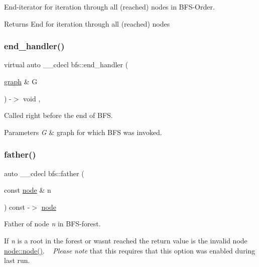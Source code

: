End-\/iterator for iteration through all (reached) nodes in B\+F\+S-\/\+Order. 

\begin{DoxyReturn}{Returns}
End for iteration through all (reached) nodes 
\end{DoxyReturn}
\mbox{\label{classbfs_a6c31ed93b4646218a90ded9ef7bb8366}} 
\subsubsection{\texorpdfstring{end\+\_\+handler()}{end\_handler()}}
{\footnotesize\ttfamily virtual auto \+\_\+\+\_\+cdecl bfs\+::end\+\_\+handler (\begin{DoxyParamCaption}\item[{\mbox{\hyperlink{classgraph}{graph}} \&}]{G }\end{DoxyParamCaption}) -\/$>$ void \hspace{0.3cm}{\ttfamily [inline]}, {\ttfamily [virtual]}}



Called right before the end of B\+FS. 


\begin{DoxyParams}{Parameters}
{\em G} & graph for which B\+FS was invoked. \\
\hline
\end{DoxyParams}
\mbox{\label{classbfs_ab8a8b65048c4ffb6caa7651b793e4e56}} 
\subsubsection{\texorpdfstring{father()}{father()}}
{\footnotesize\ttfamily auto \+\_\+\+\_\+cdecl bfs\+::father (\begin{DoxyParamCaption}\item[{const \mbox{\hyperlink{classnode}{node}} \&}]{n }\end{DoxyParamCaption}) const -\/$>$ \mbox{\hyperlink{classnode}{node}}
	\hspace{0.3cm}{\ttfamily [inline]}}



Father of node {\itshape n} in B\+F\+S-\/forest. 

If {\itshape n} is a root in the forest or wasn\textquotesingle{}t reached the return value is the invalid node \mbox{\hyperlink{classnode_ad603259398d5667e3b97a6322a2bcc20}{node\+::node()}}. ~\newline
 {\itshape Please} {\itshape note} that this requires that this option was enabled during last run.


